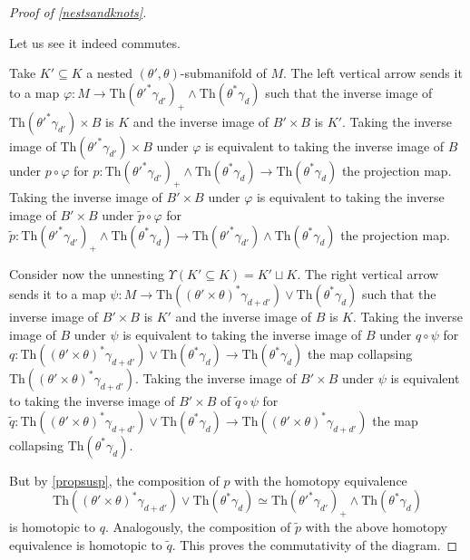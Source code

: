 \documentclass[a4paper, 11pt,reqno]{amsart}
\theoremstyle{plain}
\theoremstyle{definition}
\newcommand{\Th}{\mathrm{Th}}
\begin{document}
\begin{proof}[Proof of \cref{nestsandknots}]
\begin{center}
\end{center}
Let us see it indeed commutes.\par
Take $K'\subseteq K$ a nested $(\theta',\theta)$-submanifold of $M$. The left vertical arrow sends it to a map $\varphi\colon M\to{\Th(\theta'^\ast\gamma_{d'})}_+\wedge \Th(\theta^\ast\gamma_{d})$ such that the inverse image of $\Th(\theta'^\ast\gamma_{d'})\times B$ is $K$ and the inverse image of $B'\times B$ is $K'$. Taking the inverse image of $\Th(\theta'^\ast\gamma_{d'})\times B$ under $\varphi$ is equivalent to taking the inverse image of $B$ under $p\circ \varphi$ for $p\colon {\Th(\theta'^\ast\gamma_{d'})}_+\wedge \Th(\theta^\ast\gamma_{d})\to\Th(\theta^\ast\gamma_{d})$ the projection map. Taking the inverse image of $B'\times B$ under $\varphi$ is equivalent to taking the inverse image of $B'\times B$ under $\widetilde{p}\circ \varphi$ for $\widetilde{p}\colon {\Th(\theta'^\ast\gamma_{d'})}_+\wedge \Th(\theta^\ast\gamma_{d})\to \Th(\theta'^\ast\gamma_{d'})\wedge \Th(\theta^\ast\gamma_{d})$ the projection map.\par
Consider now the unnesting $\Upsilon(K'\subseteq K)=K'\sqcup K$. The right vertical arrow sends it to a map $\psi\colon M\to \Th((\theta'\times\theta)^\ast\gamma_{d+d'})\vee\Th(\theta^\ast\gamma_{d})$ such that the inverse image of $B'\times B$ is $K'$ and the inverse image of $B$ is $K$. Taking the inverse image of $B$ under $\psi$ is equivalent to taking the inverse image of $B$ under $q\circ\psi$ for $q\colon \Th((\theta'\times\theta)^\ast\gamma_{d+d'})\vee\Th(\theta^\ast\gamma_{d})\to\Th(\theta^\ast\gamma_{d})$ the map collapsing $\Th((\theta'\times\theta)^\ast\gamma_{d+d'})$. Taking the inverse image of $B'\times B$ under $\psi$ is equivalent to taking the inverse image of $B'\times B$ of $\widetilde{q}\circ\psi$ for $\widetilde{q}\colon \Th((\theta'\times\theta)^\ast\gamma_{d+d'})\vee\Th(\theta^\ast\gamma_{d})\to\Th((\theta'\times\theta)^\ast\gamma_{d+d'})$ the map collapsing $\Th(\theta^\ast\gamma_{d})$. \par
But by \cref{propsusp}, the composition of $p$ with the homotopy equivalence 
\[\Th((\theta'\times\theta)^\ast\gamma_{d+d'})\vee\Th(\theta^\ast\gamma_{d})\simeq {\Th(\theta'^\ast\gamma_{d'})}_+\wedge \Th(\theta^\ast\gamma_{d})\] is homotopic to $q$. Analogously, the composition of $\widetilde{p}$ with the above homotopy equivalence is homotopic to $\widetilde{q}$. This proves the commutativity of the diagram.
\end{proof}
\end{document}
